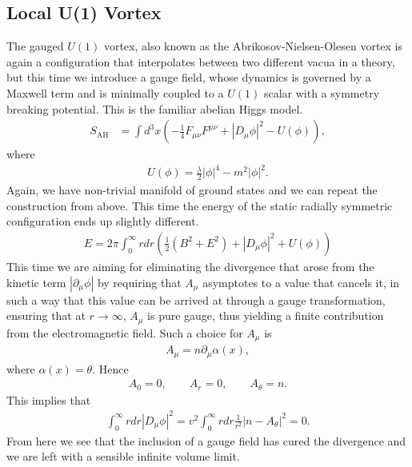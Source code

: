         \subsection{Local U(1) Vortex}
        The gauged $U(1)$ vortex, also known as the Abrikosov-Nielsen-Olesen vortex is again a configuration that interpolates between two different vacua in a theory, but this time we introduce a gauge field, whose dynamics is governed by a Maxwell term and is minimally coupled to a $U(1)$ scalar with a symmetry breaking potential. This is the familiar abelian Higgs model. 
        \begin{align}
            S_{\text{AH}} & = \int d^3x \left(-\frac{1}{4} F_{\mu \nu} F^{\mu \nu} + | D_{\mu} \phi|^2 - U(\phi) \right), \label{eq:Abelian_Higgs_Model}
        \end{align}
        where
        \begin{align}
            U(\phi) = \frac{\lambda}{2} |\phi|^4 - m^2 |\phi|^2.
        \end{align}
    Again, we have non-trivial manifold of ground states and we can repeat the construction from above. This time the energy of the static radially symmetric configuration ends up slightly different.
    \begin{align}
        E = 2 \pi \int_0^{\infty} r dr \left(\frac{1}{2}( B^2 + E^2) + |D_{\mu} \phi|^2 + U(\phi) \right)
    \end{align}
    This time we are aiming for eliminating the divergence that arose from the kinetic term $|\partial_{\mu}\phi|$ by requiring that $A_{\mu}$ asymptotes to a value that cancels it, in such a way that this value can be arrived at through a gauge transformation, ensuring that at $r\rightarrow \infty$, $A_{\mu}$ is pure gauge, thus yielding a finite contribution from the electromagnetic field. Such a choice for $A_{\mu}$ is
    \begin{align}
        A_{\mu} = n \partial_{\mu} \alpha(x),
    \end{align}
    where $\alpha(x) = \theta$. Hence
    \begin{align}
        A_0 =0, \qquad A_r =0, \qquad A_{\theta} = n.
    \end{align}
    This implies that
    \begin{align}
        \int_0^{\infty} r dr |D_{\mu}\phi|^2 = v^2\int_0^{\infty} r dr  \frac{1}{r^2}|n-A_{\theta}|^2 =0.
    \end{align}
    From here we see that the inclusion of a gauge field has cured the divergence and we are left with a sensible infinite volume limit. 

